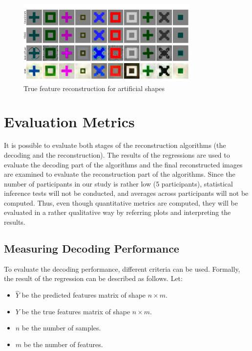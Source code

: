 \begin{figure}[ht]
    \centering
    \includegraphics[width=0.8\textwidth]{plots/baseline_qual_true_recon_art.JPEG}
    \caption{True feature reconstruction for artificial shapes}\label{fig:baselinetruerecon_art}
\end{figure}


\section{Evaluation Metrics}

It is possible to evaluate both stages of the reconstruction algorithms (the decoding and the reconstruction). The results of the regressions are used to evaluate the decoding part of the algorithms and the final reconstructed images are examined to evaluate the reconstruction part of the algorithms. Since the number of participants in our study is rather low (5 participants), statistical inference tests will not be conducted, and averages across participants will not be computed. Thus, even though quantitative metrics are computed, they will be evaluated in a rather qualitative way by referring plots and interpreting the results.

\subsection{Measuring Decoding Performance}
To evaluate the decoding performance, different criteria can be used. Formally, the result of the regression can be described as follows. Let:
\begin{itemize}
    \item \( \hat{Y} \) be the predicted features matrix of shape \( n \times m \).
    \item \( Y \) be the true features matrix of shape \( n \times m \).
    \item \( n \) be the number of samples.
    \item \( m \) be the number of features.
\end{itemize}

